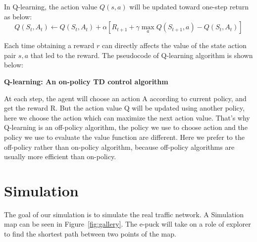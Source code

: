 \documentclass[a4paper, 11pt]{article} %
\begin{document}
In Q-learning, the action value $Q(s,a)$ will be updated toward one-step return as below:$$Q(S_t,A_t)\leftarrow Q(S_t,A_t)+ \alpha [ R_{t+1} + \gamma \max \limits_{a}Q(S_{t+1},a)-Q(S_t,A_t)]$$

Each time obtaining a reward $r$ can directly affects the value of the state action pair $s,a$ that led to the reward. The pseudocode of Q-learning algorithm is shown below:
\begin{center}\textbf{Q-learning: An on-policy TD control algorithm}


\end{center}

At each step, the agent will choose an action A according to current policy, and get the reward R. But the action value Q will be updated using another policy, here we choose the action which can maximize the next action value. That's why Q-learning is an off-policy algorithm, the policy we use to choose action and the policy we use to evaluate the value function are different. Here we prefer to the off-policy rather than on-policy algorithm, because off-policy algorithms are usually more efficient than on-policy.

\section{Simulation}
The goal of our simulation is to simulate the real traffic network. A Simulation map can be seen in Figure~\ref{fig:gallery}. The e-puck will take on a role of explorer to find the shortest path between two points of the map.
\end{document}
